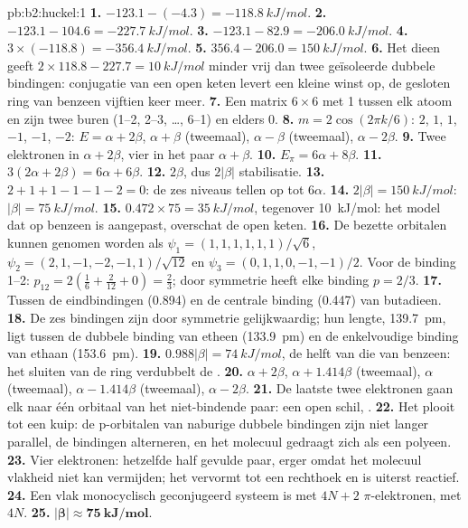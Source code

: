 \begin{solution}{pb:b2:huckel:1}
\textbf{1.} $-123.1 - (-4.3) = \qty{-118.8}{kJ/mol}$.
\textbf{2.} $-123.1 - 104.6 = \qty{-227.7}{kJ/mol}$.
\textbf{3.} $-123.1 - 82.9 = \qty{-206.0}{kJ/mol}$.
\textbf{4.} $3 \times (-118.8) = \qty{-356.4}{kJ/mol}$.
\textbf{5.} $356.4 - 206.0 = \qty{150}{kJ/mol}$.
\textbf{6.} Het dieen geeft $2 \times 118.8 - 227.7 = \qty{10}{kJ/mol}$ minder vrij dan twee
geïsoleerde dubbele bindingen: conjugatie van een open keten levert een kleine winst op, de gesloten
ring van benzeen vijftien keer meer.
\textbf{7.} Een matrix $6 \times 6$ met 1 tussen elk atoom en zijn twee buren (1--2, 2--3,
\dots, 6--1) en elders 0.
\textbf{8.} $m = 2\cos(2\pi k/6)$: $2$, $1$, $1$, $-1$, $-1$, $-2$: $E = \alpha + 2\beta$, $\alpha + \beta$ (tweemaal),
$\alpha - \beta$ (tweemaal), $\alpha - 2\beta$.
\textbf{9.} Twee elektronen in $\alpha + 2\beta$, vier in het paar $\alpha + \beta$.
\textbf{10.} $E_\pi = 6\alpha + 8\beta$.
\textbf{11.} $3(2\alpha + 2\beta) = 6\alpha + 6\beta$.
\textbf{12.} $2\beta$, dus $2|\beta|$ stabilisatie.
\textbf{13.} $2 + 1 + 1 - 1 - 1 - 2 = 0$: de zes niveaus tellen op tot $6\alpha$.
\textbf{14.} $2|\beta| = \qty{150}{kJ/mol}$: $|\beta| = \qty{75}{kJ/mol}$.
\textbf{15.} $0.472 \times 75 = \qty{35}{kJ/mol}$, tegenover \qty{10}{kJ/mol}: het model dat
op benzeen is aangepast, overschat de open keten.
\textbf{16.} De bezette orbitalen kunnen genomen worden als $\psi_1 = (1, 1, 1, 1, 1, 1)/\sqrt6$,
$\psi_2 = (2, 1, -1, -2, -1, 1)/\sqrt{12}$ en $\psi_3 = (0, 1, 1, 0, -1, -1)/2$. Voor de binding
1--2: $p_{12} = 2(\frac16 + \frac{2}{12} + 0) = \frac23$; door symmetrie heeft elke binding $p = 2/3$.
\textbf{17.} Tussen de eindbindingen (0.894) en de centrale binding (0.447) van butadieen.
\textbf{18.} De zes bindingen zijn door symmetrie gelijkwaardig; hun lengte, \qty{139.7}{pm}, ligt
tussen de dubbele binding van etheen (\qty{133.9}{pm}) en de enkelvoudige binding van ethaan
(\qty{153.6}{pm}).
\textbf{19.} $0.988|\beta| = \qty{74}{kJ/mol}$, de helft van die van benzeen: het sluiten van de ring verdubbelt de
.
\textbf{20.} $\alpha + 2\beta$, $\alpha + 1.414\beta$ (tweemaal), $\alpha$ (tweemaal), $\alpha - 1.414\beta$ (tweemaal),
$\alpha - 2\beta$.
\textbf{21.} De laatste twee elektronen gaan elk naar één orbitaal van het niet-bindende paar: een open
schil, .
\textbf{22.} Het plooit tot een kuip: de p-orbitalen van naburige dubbele bindingen zijn niet langer
parallel, de bindingen alterneren, en het molecuul gedraagt zich als een polyeen.
\textbf{23.} Vier elektronen: hetzelfde half gevulde paar, erger omdat het molecuul
vlakheid niet kan vermijden; het vervormt tot een rechthoek en is uiterst reactief.
\textbf{24.} Een vlak monocyclisch geconjugeerd systeem is  met $4N + 2$ $\pi$-elektronen,
 met $4N$.
\textbf{25.} $\boldsymbol{|\beta| \approx \qty{75}{kJ/mol}}$.
\end{solution}
